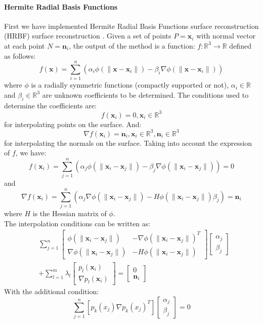 \documentclass[ams]{U-AizuGT}
\def\x{\mathbf{x}}
\def\R{\mathbb{R}}
\def\n{\mathbf{n}}
\begin{document}
\paragraph{Hermite Radial Basis Functions}
First we have implemented Hermite Radial Basis Functions surface reconstruction (HRBF) 
surface reconstruction \cite{MGV11}. 
Given a set of points $P = {\x_i}$ with normal vector at each point $N = {\n_i}$, 
the output of the method is a function: $f : \R^3 \to \R$ defined as follows:
\[
f(\x)=\sum_{i=1}^n(\alpha_i\phi(\|\x-\x_i\|)-\beta_i\nabla\phi(\|\x-\x_i\|))
\]
where $\phi$ is a radially symmetric functions (compactly supported or not), 
$\alpha_i \in \R$ and $\beta_i \in \R^3$ are unknown coefficients to be determined. 
The conditions used to determine the coefficients are: \[f(\x_i) = 0, \x_i \in \R^3\]
for interpolating points on the surface. And: \[\nabla f(\x_i)=\n_i, \x_i \in \R^3, \n_i \in \R^3\]
for interpolating the normals on the surface.
Taking into account the expression of $f$, we have:
\[f(\x_i)=\sum_{j=1}^n(\alpha_j\phi(\|\x_i-\x_j\|)-\beta_j\nabla\phi(\|\x_i-\x_j\|))=0\]
and
\[\nabla f(\x_i)=\sum_{j=1}^n(\alpha_j\nabla\phi(\|\x_i-\x_j\|)-H\phi(\|\x_i-\x_j\|)\beta_j)=\n_i\]
where $H$ is the Hessian matrix of $\phi$.
\\
The interpolation conditions can be written as:
\begin{align} \label{hrbf1}
 & \sum_{j=1}^n
\begin{bmatrix}
\phi(\|\x_i-\x_j\|) & -\nabla\phi(\|\x_i-\x_j\|)^T\\ \nabla\phi(\|\x_i-\x_j\|) & -H\phi(\|\x_i-\x_j\|)
\end{bmatrix}
\begin{bmatrix}
\alpha_j\\\beta_j
\end{bmatrix} \nonumber
\\
 & + \sum_{l=1}^m\lambda_l
\begin{bmatrix}
p_l(\x_i)\\\nabla p_l(\x_i)
\end{bmatrix}
=
\begin{bmatrix}
0 \\ \n_i
\end{bmatrix}
\end{align}
With the additional condition:
\begin{equation} \label{hrbfcond}
\sum_{j=1}^n[p_k(x_j)\nabla p_k(x_j)^T]\begin{bmatrix}\alpha_j\\\beta_j\end{bmatrix}=0
\end{equation}
\end{document}
